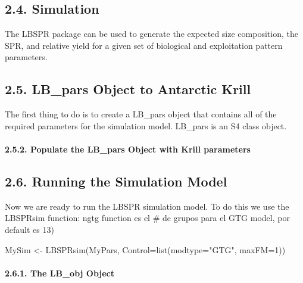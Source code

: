 \documentclass[
]{article}
\newenvironment{Shaded}{\begin{snugshade}}{\end{snugshade}}
\newcommand{\AttributeTok}[1]{\textcolor[rgb]{0.77,0.63,0.00}{#1}}
\newcommand{\DecValTok}[1]{\textcolor[rgb]{0.00,0.00,0.81}{#1}}
\newcommand{\FunctionTok}[1]{\textcolor[rgb]{0.00,0.00,0.00}{#1}}
\newcommand{\NormalTok}[1]{#1}
\newcommand{\OtherTok}[1]{\textcolor[rgb]{0.56,0.35,0.01}{#1}}
\newcommand{\StringTok}[1]{\textcolor[rgb]{0.31,0.60,0.02}{#1}}
\begin{document}
\newpage

\hypertarget{simulation}{%
\subsection{2.4. Simulation}\label{simulation}}

The LBSPR package can be used to generate the expected size composition,
the SPR, and relative yield for a given set of biological and
exploitation pattern parameters.

\hypertarget{lb_pars-object-to-antarctic-krill}{%
\subsection{2.5. LB\_pars Object to Antarctic
Krill}\label{lb_pars-object-to-antarctic-krill}}

The first thing to do is to create a LB\_pars object that contains all
of the required parameters for the simulation model. LB\_pars is an S4
class object.

\hypertarget{populate-the-lb_pars-object-with-krill-parameters}{%
\paragraph{2.5.2. Populate the LB\_pars Object with Krill
parameters}\label{populate-the-lb_pars-object-with-krill-parameters}}

\hypertarget{running-the-simulation-model}{%
\subsection{2.6. Running the Simulation
Model}\label{running-the-simulation-model}}

Now we are ready to run the LBSPR simulation model. To do this we use
the LBSPRsim function: ngtg function es el \# de grupos para el GTG
model, por default es 13)

\begin{Shaded}
\begin{Highlighting}[]
\NormalTok{MySim }\OtherTok{\textless{}{-}} \FunctionTok{LBSPRsim}\NormalTok{(MyPars, }
                  \AttributeTok{Control=}\FunctionTok{list}\NormalTok{(}\AttributeTok{modtype=}\StringTok{"GTG"}\NormalTok{, }
                               \AttributeTok{maxFM=}\DecValTok{1}\NormalTok{)) }
\end{Highlighting}
\end{Shaded}

\hypertarget{the-lb_obj-object}{%
\paragraph{2.6.1. The LB\_obj Object}\label{the-lb_obj-object}}
\end{document}
